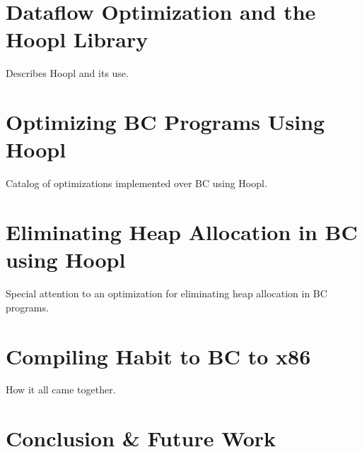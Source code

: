 \documentclass[11pt]{article}
\begin{document}
\section{Dataflow Optimization and the Hoopl Library}

Describes Hoopl and its use.

\section{Optimizing BC Programs Using Hoopl}

Catalog of optimizations implemented over BC using Hoopl.

\section{Eliminating Heap Allocation in BC using Hoopl}

Special attention to an optimization for eliminating heap allocation
in BC programs.

\section{Compiling Habit to BC to x86}

How it all came together.

\section{Conclusion \& Future Work}
\end{document}
